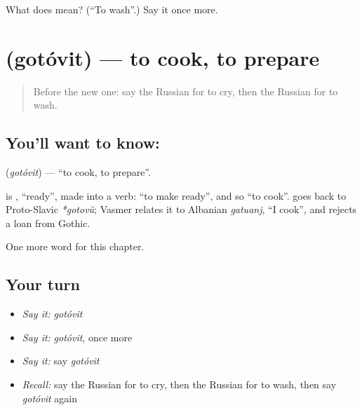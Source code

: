 \begin{tcolorbox}[breakable,colback=teal!4,colframe=teal!35!black,title={Before you move on}]
What does  mean? (\textquotedblleft{}To wash\textquotedblright{}.) Say it once more.
\end{tcolorbox}
\section[\texorpdfstring{\ru{готовить} (gotóvit)}{готовить (gotóvit)}]{ (gotóvit) — to cook, to prepare}

\label{lesson:RU-C39-gotovit}



\begin{quote}
Before the new one: say the Russian for to cry, then the Russian for to wash.
\end{quote}

\subsection*{You'll want to know: }
\textbf{} (\emph{gotóvit}) — \textquotedblleft{}to cook, to prepare\textquotedblright{}.

\begin{cousinweb}
\textbf{} is \emph{}, \textquotedblleft{}ready\textquotedblright{}, made into a verb: \textquotedblleft{}to make ready\textquotedblright{}, and so \textquotedblleft{}to cook\textquotedblright{}. \emph{} goes back to Proto-Slavic \emph{*gotovŭ}; Vasmer relates it to Albanian \emph{gatuanj}, \textquotedblleft{}I cook\textquotedblright{}, and rejects a loan from Gothic.
\end{cousinweb}

\begin{grammarlens}[title={What you've built}]
One more word for this chapter.
\end{grammarlens}

\subsection*{Your turn}
\begin{itemize}
\raggedright
  \item \emph{Say it:} \emph{gotóvit}
  \item \emph{Say it:} \emph{gotóvit}, once more
  \item \emph{Say it:} say \emph{gotóvit}
  \item \emph{Recall:} say the Russian for to cry, then the Russian for to wash, then say \emph{gotóvit} again
\end{itemize}

